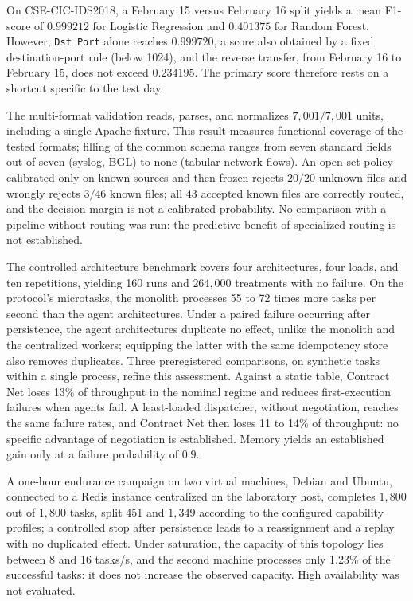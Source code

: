 On CSE-CIC-IDS2018, a February 15 versus February 16 split yields a mean
F1-score of $0.999212$ for Logistic Regression and $0.401375$ for Random
Forest. However, \texttt{Dst Port} alone reaches $0.999720$, a score also
obtained by a fixed destination-port rule (below 1024), and the reverse
transfer, from February 16 to February 15, does not exceed $0.234195$. The
primary score therefore rests on a shortcut specific to the test day.

The multi-format validation reads, parses, and normalizes $7{,}001/7{,}001$
units, including a single Apache fixture. This result measures functional
coverage of the tested formats; filling of the common schema ranges from seven
standard fields out of seven (syslog, BGL) to none (tabular network flows). An
open-set policy calibrated only on known sources and then frozen rejects
$20/20$ unknown files and wrongly rejects $3/46$ known files; all 43 accepted
known files are correctly routed, and the decision margin is not a calibrated
probability. No comparison with a pipeline without routing was run: the
predictive benefit of specialized routing is not established.

The controlled architecture benchmark covers four architectures, four loads,
and ten repetitions, yielding 160 runs and $264{,}000$ treatments with no
failure. On the protocol's microtasks, the monolith processes 55 to 72 times more tasks per second than the agent architectures. Under a paired failure occurring
after persistence, the agent architectures duplicate no effect, unlike the
monolith and the centralized workers; equipping the latter with the same idempotency store also removes duplicates. Three preregistered comparisons, on synthetic tasks within a single process, refine this assessment. Against a static table, Contract Net loses 13\% of throughput in the nominal regime and reduces first-execution failures when agents fail. A least-loaded dispatcher, without negotiation, reaches the same failure rates, and Contract Net then loses 11 to 14\% of throughput: no specific advantage of negotiation is established. Memory yields an established gain only at a failure probability of $0.9$.

A one-hour endurance campaign on two virtual machines, Debian and Ubuntu,
connected to a Redis instance centralized on the laboratory host, completes
$1{,}800$ out of $1{,}800$ tasks, split 451 and $1{,}349$ according to the
configured capability profiles; a controlled stop after persistence leads to
a reassignment and a replay with no duplicated effect. Under saturation, the
capacity of this topology lies between 8 and 16 tasks/s, and the second
machine processes only 1.23\% of the successful tasks: it does not increase
the observed capacity. High availability was not evaluated.

